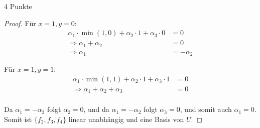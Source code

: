 \documentclass{problemset}
\begin{document}
\begin{problem}{4 Punkte}
\begin{proof}
	Für $x = 1, y = 0$:
	\begin{align*}
		\alpha_1 \cdot \min(1, 0) + \alpha_2 \cdot 1 + \alpha_3 \cdot 0 & = 0         \\
		\Rightarrow \alpha_1 + \alpha_2                                 & = 0         \\
		\Rightarrow \alpha_1                                            & = -\alpha_2
	\end{align*}

	Für $x = 1, y = 1$:
	\begin{align*}
		\alpha_1 \cdot \min(1, 1) + \alpha_2 \cdot 1 + \alpha_3 \cdot 1 & = 0 \\
		\Rightarrow \alpha_1 + \alpha_2 + \alpha_3                      & = 0 \\
	\end{align*}

	Da $\alpha_1 = - \alpha_3$ folgt $\alpha_2 = 0$, und da $\alpha_1 = - \alpha_2$ folgt $\alpha_3 = 0$, und somit auch $\alpha_1 = 0$.
	Somit ist $\{f_2, f_3, f_4\}$ linear unabhängig und eine Basis von $U$.
\end{proof}
\end{problem}
\end{document}
